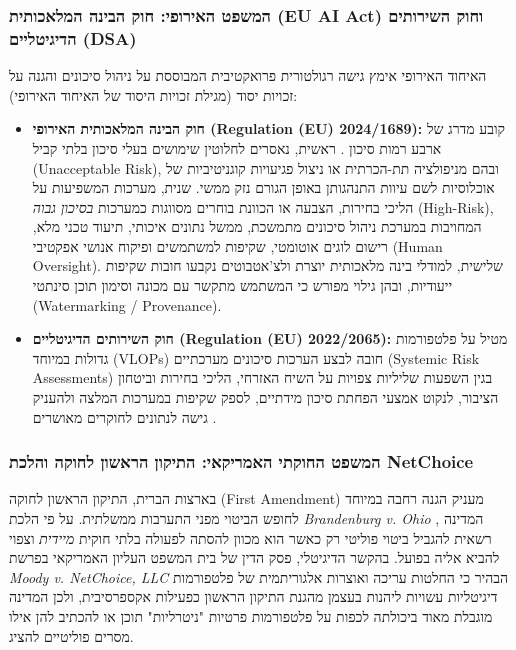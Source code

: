 \subsubsection{המשפט האירופי: חוק הבינה המלאכותית (EU AI Act) וחוק השירותים הדיגיטליים (DSA)}
האיחוד האירופי אימץ גישה רגולטורית פרואקטיבית המבוססת על ניהול סיכונים והגנה על זכויות יסוד (מגילת זכויות היסוד של האיחוד האירופי):
\begin{itemize}
    \item \textbf{חוק הבינה המלאכותית האירופי (Regulation (EU) 2024/1689):} קובע מדרג של ארבע רמות סיכון \cite{euaiact2024}. ראשית, נאסרים לחלוטין שימושים בעלי סיכון בלתי קביל (Unacceptable Risk), ובהם מניפולציה תת-הכרתית או ניצול פגיעויות קוגניטיביות של אוכלוסיות לשם עיוות התנהגותן באופן הגורם נזק ממשי. שנית, מערכות המשפיעות על הליכי בחירות, הצבעה או הכוונת בוחרים מסווגות כמערכות \emph{בסיכון גבוה} (High-Risk), המחויבות במערכת ניהול סיכונים מתמשכת, ממשל נתונים איכותי, תיעוד טכני מלא, רישום לוגים אוטומטי, שקיפות למשתמשים ופיקוח אנושי אפקטיבי (Human Oversight). שלישית, למודלי בינה מלאכותית יוצרת ולצ'אטבוטים נקבעו חובות שקיפות ייעודיות, ובהן גילוי מפורש כי המשתמש מתקשר עם מכונה וסימון תוכן סינתטי (Watermarking / Provenance).
    \item \textbf{חוק השירותים הדיגיטליים (Regulation (EU) 2022/2065):} מטיל על פלטפורמות גדולות במיוחד (VLOPs) חובה לבצע הערכות סיכונים מערכתיים (Systemic Risk Assessments) בגין השפעות שליליות צפויות על השיח האזרחי, הליכי בחירות וביטחון הציבור, לנקוט אמצעי הפחתת סיכון מידתיים, לספק שקיפות במערכות המלצה ולהעניק גישה לנתונים לחוקרים מאושרים \cite{eudsa2022}.
\end{itemize}

\subsubsection{המשפט החוקתי האמריקאי: התיקון הראשון לחוקה והלכת NetChoice}
בארצות הברית, התיקון הראשון לחוקה (First Amendment) מעניק הגנה רחבה במיוחד לחופש הביטוי מפני התערבות ממשלתית. על פי הלכת \emph{Brandenburg v. Ohio} \cite{brandenburg1969}, המדינה רשאית להגביל ביטוי פוליטי רק כאשר הוא מכוון להסתה לפעולה בלתי חוקית \emph{מיידית} וצפוי להביא אליה בפועל. בהקשר הדיגיטלי, פסק הדין של בית המשפט העליון האמריקאי בפרשת \emph{Moody v. NetChoice, LLC} \cite{netchoice2024} הבהיר כי החלטות עריכה ואוצרות אלגוריתמית של פלטפורמות דיגיטליות עשויות ליהנות בעצמן מהגנת התיקון הראשון כפעילות אקספרסיבית, ולכן המדינה מוגבלת מאוד ביכולתה לכפות על פלטפורמות פרטיות "ניטרליות" תוכן או להכתיב להן אילו מסרים פוליטיים להציג.

